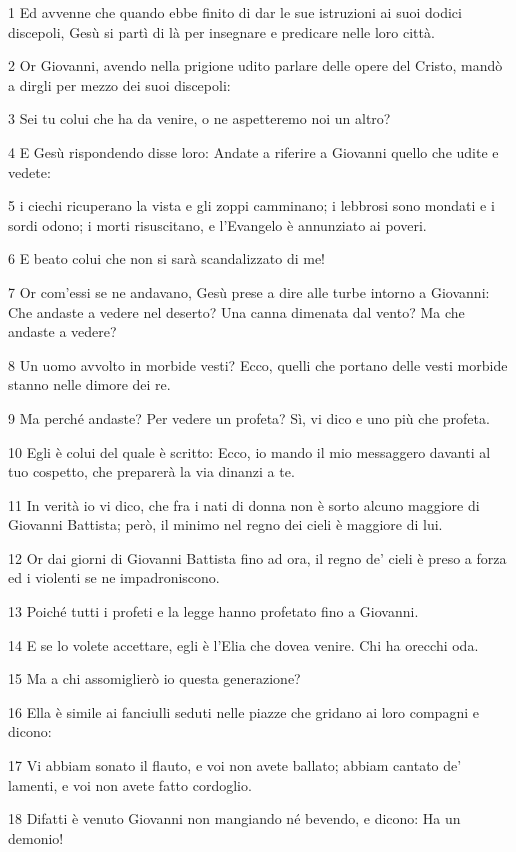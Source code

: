 \par 1 Ed avvenne che quando ebbe finito di dar le sue istruzioni ai suoi dodici discepoli, Gesù si partì di là per insegnare e predicare nelle loro città.
\par 2 Or Giovanni, avendo nella prigione udito parlare delle opere del Cristo, mandò a dirgli per mezzo dei suoi discepoli:
\par 3 Sei tu colui che ha da venire, o ne aspetteremo noi un altro?
\par 4 E Gesù rispondendo disse loro: Andate a riferire a Giovanni quello che udite e vedete:
\par 5 i ciechi ricuperano la vista e gli zoppi camminano; i lebbrosi sono mondati e i sordi odono; i morti risuscitano, e l'Evangelo è annunziato ai poveri.
\par 6 E beato colui che non si sarà scandalizzato di me!
\par 7 Or com'essi se ne andavano, Gesù prese a dire alle turbe intorno a Giovanni: Che andaste a vedere nel deserto? Una canna dimenata dal vento? Ma che andaste a vedere?
\par 8 Un uomo avvolto in morbide vesti? Ecco, quelli che portano delle vesti morbide stanno nelle dimore dei re.
\par 9 Ma perché andaste? Per vedere un profeta? Sì, vi dico e uno più che profeta.
\par 10 Egli è colui del quale è scritto: Ecco, io mando il mio messaggero davanti al tuo cospetto, che preparerà la via dinanzi a te.
\par 11 In verità io vi dico, che fra i nati di donna non è sorto alcuno maggiore di Giovanni Battista; però, il minimo nel regno dei cieli è maggiore di lui.
\par 12 Or dai giorni di Giovanni Battista fino ad ora, il regno de' cieli è preso a forza ed i violenti se ne impadroniscono.
\par 13 Poiché tutti i profeti e la legge hanno profetato fino a Giovanni.
\par 14 E se lo volete accettare, egli è l'Elia che dovea venire. Chi ha orecchi oda.
\par 15 Ma a chi assomiglierò io questa generazione?
\par 16 Ella è simile ai fanciulli seduti nelle piazze che gridano ai loro compagni e dicono:
\par 17 Vi abbiam sonato il flauto, e voi non avete ballato; abbiam cantato de' lamenti, e voi non avete fatto cordoglio.
\par 18 Difatti è venuto Giovanni non mangiando né bevendo, e dicono: Ha un demonio!
